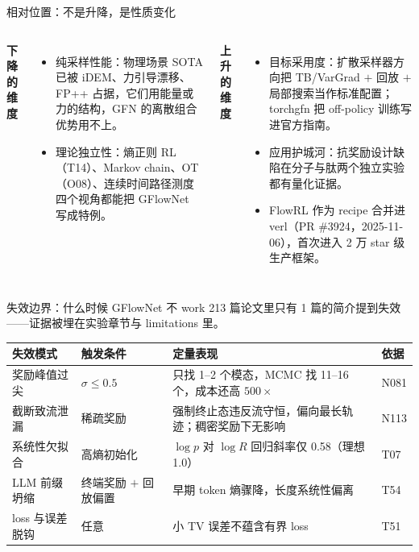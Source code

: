 \documentclass[aspectratio=169,10pt]{beamer}
\newcommand{\pos}[1]{\textcolor{positive}{#1}}
\newcommand{\con}[1]{\textcolor{negative}{#1}}
\begin{document}
\begin{frame}{相对位置：不是升降，是性质变化}
  \begin{columns}[T]
      \textbf{\con{下降的维度}}
      \begin{itemize}
        \item 纯采样性能：物理场景 SOTA 已被 iDEM、力引导漂移、FP++ 占据，它们用能量或力的结构，GFN 的离散组合优势用不上。
        \item 理论独立性：熵正则 RL（T14）、Markov chain、OT（O08）、连续时间路径测度四个视角都能把 GFlowNet 写成特例。
      \end{itemize}
      \textbf{\pos{上升的维度}}
      \begin{itemize}
        \item 目标采用度：扩散采样器方向把 TB/VarGrad $+$ 回放 $+$ 局部搜索当作标准配置；torchgfn 把 off-policy 训练写进官方指南。
        \item 应用护城河：抗奖励设计缺陷在分子与肽两个独立实验都有量化证据。
        \item FlowRL 作为 recipe 合并进 verl（PR \#3924，2025-11-06），首次进入 2 万 star 级生产框架。
      \end{itemize}
  \end{columns}
\end{frame}

\begin{frame}{失效边界：什么时候 GFlowNet 不 work}
  213 篇论文里只有 1 篇的简介提到失效——证据被埋在实验章节与 limitations 里。
  \vspace{4pt}
  \begin{center}
  \begin{tabular}{llp{5.4cm}l}
    \toprule
    失效模式 & 触发条件 & 定量表现 & 依据 \\
    \midrule
    奖励峰值过尖 & $\sigma \le 0.5$ & 只找 1--2 个模态，MCMC 找 11--16 个，成本还高 $500\times$ & N081 \\
    截断致流泄漏 & 稀疏奖励 & 强制终止态违反流守恒，偏向最长轨迹；稠密奖励下无影响 & N113 \\
    系统性欠拟合 & 高熵初始化 & $\log p$ 对 $\log R$ 回归斜率仅 0.58（理想 1.0） & T07 \\
    LLM 前缀坍缩 & 终端奖励 $+$ 回放偏置 & 早期 token 熵骤降，长度系统性偏离 & T54 \\
    loss 与误差脱钩 & 任意 & 小 TV 误差不蕴含有界 loss & T51 \\
    \bottomrule
  \end{tabular}
  \end{center}
\end{frame}
\end{document}
